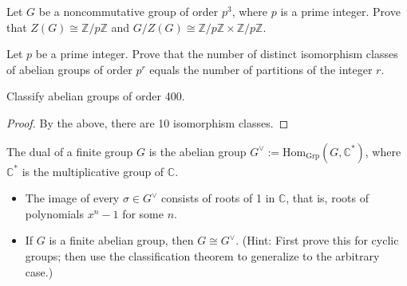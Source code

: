 \documentclass[openany]{book}
\begin{document}
\begin{prop}
Let \( G \) be a noncommutative group of order \( p^3 \), where \( p \) is a prime integer. Prove that \( Z(G) \cong \mathbb{Z}/p\mathbb{Z} \) and \( G/Z(G) \cong \mathbb{Z}/p\mathbb{Z} \times \mathbb{Z}/p\mathbb{Z} \).
\end{prop}




\begin{prop}
Let \( p \) be a prime integer. Prove that the number of distinct isomorphism classes of abelian groups of order \( p^r \) equals the number of partitions of the integer \( r \).
\end{prop}

\begin{prob}
    Classify abelian groups of order 400.
\end{prob}
\begin{proof}
    By the above, there are 10 isomorphism classes.
\end{proof}

\begin{prop}
The dual of a finite group \( G \) is the abelian group \( G^\vee := \text{Hom}_{\text{Grp}}(G, \mathbb{C}^*) \), where \( \mathbb{C}^* \) is the multiplicative group of \( \mathbb{C} \).
\begin{itemize}
    \item The image of every \( \sigma \in G^\vee \) consists of roots of 1 in \( \mathbb{C} \), that is, roots of polynomials \( x^n - 1 \) for some \( n \).
    \item If \( G \) is a finite abelian group, then \( G \cong G^\vee \). (Hint: First prove this for cyclic groups; then use the classification theorem to generalize to the arbitrary case.)
\end{itemize}
\end{prop}
\end{document}
